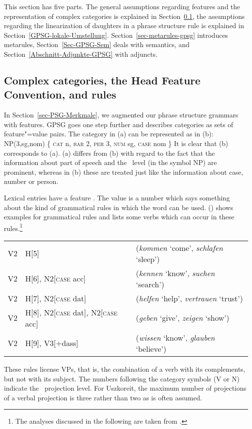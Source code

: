 This section has five parts. The general assumptions regarding features and the representation of
complex categories is explained in Section~\ref{sec-complex-categories-gpsg}, the assumptions
regarding the linearization of daughters in a phrase structure rule is explained in
Section~\ref{GPSG-lokale-Umstellung}. Section~\ref{sec-metarules-gpsg} introduces metarules, Section~\ref{Sec-GPSG-Sem} deals with
semantics, and Section~\ref{Abschnitt-Adjunkte-GPSG} with adjuncts.

\subsection{Complex categories, the Head Feature Convention, and \xbar rules}
\label{sec-complex-categories-gpsg}

In Section~\ref{sec-PSG-Merkmale}, we augmented our phrase structure grammars with features. GPSG goes one step further and describes categories as sets of feature"=value pairs.
The category in (a) can be represented as in (b):
\eal
\ex NP(3,sg,{nom})
\ex \{ \textsc{cat} n, \textsc{bar} 2, \textsc{per} 3, \textsc{num} sg, \textsc{case} nom \} 
\zl
It is clear that (b) corresponds to (a). (a) differs from (b) with
regard to the fact that the information about part of speech and the \xbar~level (in the symbol NP)
are prominent, whereas in (b) these are treated just like the information about case,
number or person. 

Lexical entries have a feature \subcat. The value is a number
which says something about the kind of grammatical rules in which the word can be used. 
() shows examples for grammatical rules and lists some verbs which can occur in these rules.\footnote{%
The analyses discussed in the following are taken from .
}
\ea
\label{gpsg-regeln}
\begin{tabular}[t]{@{}l@{~$\to$~}ll@{}}
V2  & H[5]                                    & (\emph{kommen} `come', \emph{schlafen} `sleep')\\
V2  & H[6], N2[\textsc{case} acc]                & (\emph{kennen} `know', \emph{suchen} `search')\\
V2  & H[7], N2[\textsc{case} dat]                & (\emph{helfen} `help', \emph{vertrauen} `trust')\\
V2  & H[8], N2[\textsc{case} dat], N2[\textsc{case} acc]  & (\emph{geben} `give', \emph{zeigen} `show')\\
V2  & H[9], V3[+dass]                         & (\emph{wissen} `know', \emph{glauben} `believe')\\
\end{tabular}
\z
%
These rules license VPs, that is, the combination of a verb with its complements, but not with its subject. The numbers following the category symbols (V or N) indicate the
\xbar~projection level. For Uszkoreit, the maximum number of projections of a verbal projection is three
rather than two as is often assumed.

